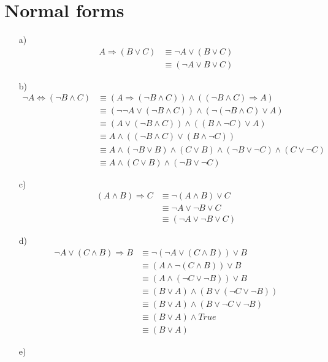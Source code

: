 \documentclass[a4paper]{article}
\begin{document}
\section{Normal forms}
\begin{itemize}
	\item[a)]
		\begin{align*}
			A \Rightarrow (B \lor C) &\equiv \neg A \lor (B \lor C) \\
			&\equiv (\neg A \lor B \lor C)
		\end{align*}
	\item[b)]
		\begin{align*}
			\neg A \Leftrightarrow (\neg B \land C) &\equiv (A \Rightarrow (\neg B \land C)) \land ((\neg B \land C) \Rightarrow A) \\
			&\equiv (\neg \neg A \lor (\neg B \land C)) \land (\neg(\neg B \land C) \lor A) \\
			&\equiv (A \lor (\neg B \land C)) \land ((B \land  \neg C) \lor A) \\
			&\equiv A \land ((\neg B \land C) \lor (B \land \neg C))\\
			&\equiv A \land (\neg B \lor B) \land (C \lor B) \land (\neg B \lor \neg C) \land (C \lor \neg C) \\
			&\equiv A \land (C \lor B)  \land (\neg B \lor \neg C)
		\end{align*}
	\item[c)]
		\begin{align*}
			(A \land B) \Rightarrow C &\equiv \neg(A \land B) \lor C \\
			&\equiv \neg A \lor \neg B \lor C \\
			&\equiv (\neg A \lor \neg B \lor C)
		\end{align*}
	\item[d)]
		\begin{align*}
			\neg A \lor (C \land B) \Rightarrow B &\equiv \neg(\neg A \lor (C \land B)) \lor B \\
			&\equiv (A \land \neg(C \land B)) \lor B \\
			&\equiv (A \land (\neg C \lor \neg B)) \lor B\\
			&\equiv (B \lor A) \land (B \lor (\neg C \lor \neg B)) \\
			&\equiv (B \lor A)  \land (B \lor \neg C \lor \neg B) \\
			&\equiv (B \lor A)  \land True \\
			&\equiv (B \lor A)
		\end{align*}
	\item[e)]

\end{itemize}
\end{document}
